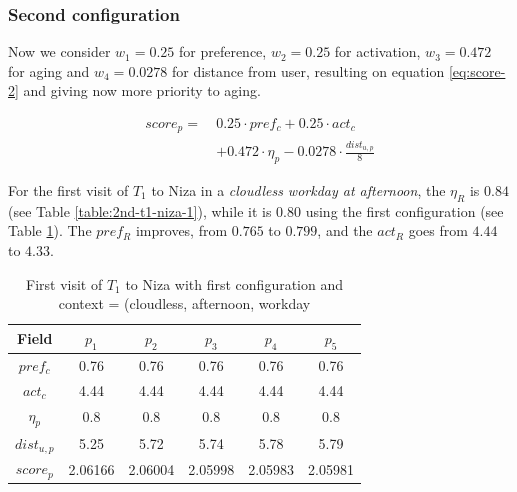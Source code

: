 \subsubsection{Second configuration} \label{section:experiment-2}
Now we consider $w_1 = 0.25$ for preference, $w_2 = 0.25$ for activation, $w_3 = 0.472$ for aging and $w_4 = 0.0278$ for distance from user, resulting on equation \ref{eq:score-2} and giving now more priority to aging.


\begin{equation} \label{eq:score-2}
    \begin{split}
        score_p = \ & 0.25 \cdot pref_c + 0.25 \cdot act_c \\
                                        &+ 0.472 \cdot \eta_p - 0.0278 \cdot \frac{dist_{u,p}}{8}
    \end{split}
\end{equation}

For the first visit of $T_1$ to Niza in a {\it cloudless workday at afternoon}, the $\eta_R$ is $0.84$
(see Table \ref{table:2nd-t1-niza-1}), while it is $0.80$ using the first configuration (see Table \ref{table:1st-t1-niza-1}). The $pref_R$ improves, from $0.765$ to $0.799$, and the $act_R$ goes from $4.44$ to $4.33$.

\begin{table}[h!]
    \centering
        \caption{First visit of $T_1$ to Niza with first configuration and context = (cloudless, afternoon, workday}
    \label{table:1st-t1-niza-1}
    \begin{tabular}{ |c|c|c|c|c|c| } 
        \hline
        Field   & $p_1$ & $p_2$ & $p_3$ & $p_4$ & $p_5$ \\
        \hline
        $pref_c$    &  0.76 & 0.76 & 0.76 & 0.76 & 0.76 \\
        $act_c$     & 4.44 & 4.44 & 4.44 & 4.44 & 4.44  \\
        $\eta_p$    & 0.8 & 0.8 & 0.8 & 0.8 & 0.8 \\
        $dist_{u,p}$ & 5.25 & 5.72 & 5.74 & 5.78 & 5.79 \\
        $score_p$    & 2.06166 & 2.06004 & 2.05998 & 2.05983 & 2.05981 \\
        
        \hline
    \end{tabular}
\end{table}

